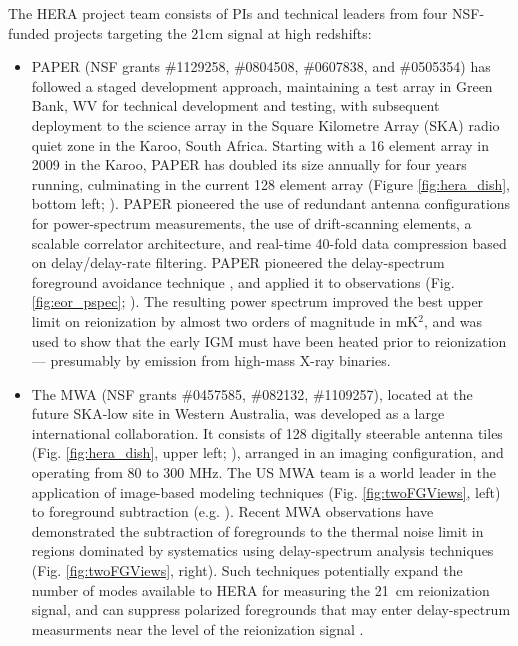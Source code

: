 \documentclass[preprint]{aastex}
\begin{document}
The HERA project team consists of PIs and technical leaders from four NSF-funded projects targeting the 21cm signal
at high redshifts:
\begin{itemize}[noitemsep,nolistsep]

\item{PAPER} (NSF grants \#1129258, \#0804508, \#0607838, and \#0505354) has followed a
staged development approach, maintaining a test array in Green Bank, WV for technical development and testing, with subsequent 
deployment to the science array in the Square Kilometre Array (SKA) radio quiet zone in the Karoo, South Africa.  Starting with a 16 element
array in 2009 in the Karoo, PAPER has doubled its size annually for four years running, culminating in the current
128 element array (Figure \ref{fig:hera_dish}, bottom left; \citealt{parsons_et_al2012a}).
PAPER pioneered the use of redundant antenna configurations
for power-spectrum measurements, the use of drift-scanning elements,
a scalable correlator architecture,
and real-time 40-fold data compression based on delay/delay-rate filtering.
PAPER pioneered the delay-spectrum foreground avoidance technique \citep{parsons_et_al2012b},
and applied it to observations (Fig. \ref{fig:eor_pspec}; \citealt{parsons_et_al2013}).
The resulting power spectrum improved the best upper
limit on reionization by almost two orders of magnitude in mK$^2$, and was used to show that the early IGM must have
been heated prior to reionization --- presumably by emission from high-mass X-ray binaries.

\item{The MWA} (NSF grants \#0457585, \#082132, \#1109257), 
located at the future SKA-low site
in Western Australia, was developed as a large international collaboration.  It consists
of 128 digitally steerable antenna tiles (Fig. \ref{fig:hera_dish}, upper left;
\citealt{tingay_et_al2013_trunc}), arranged in an imaging configuration, and operating from 80 to 300 MHz.
The US MWA team is a world leader in the application of image-based modeling techniques 
(Fig. \ref{fig:twoFGViews}, left) to
foreground subtraction (e.g. \citealt{hazelton_et_al2013,morales_et_al2006a}). %
Recent MWA observations have
demonstrated the subtraction of foregrounds to the thermal noise limit in regions dominated by systematics using
delay-spectrum analysis techniques (Fig. \ref{fig:twoFGViews}, right).
Such techniques potentially
expand the number of modes available to HERA for measuring the 21~cm reionization signal,
and can suppress polarized foregrounds that may enter delay-spectrum measurments near
the level of the reionization signal \citep{moore_et_al2013}. 


\end{itemize}
\end{document}
